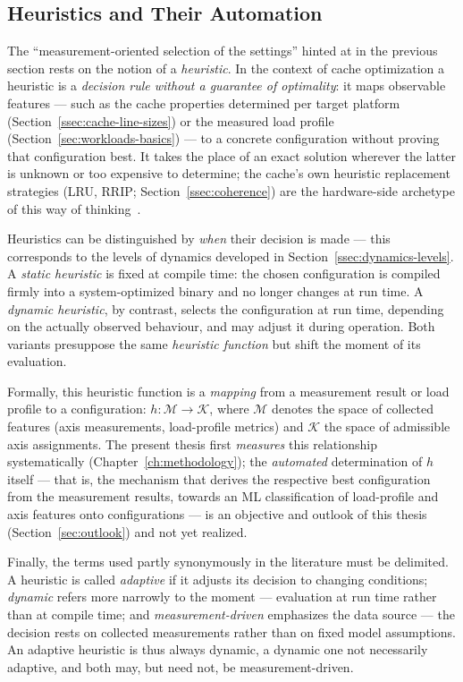 \subsection{Heuristics and Their Automation}\label{ssec:heuristics}
The ``measurement-oriented selection of the settings'' hinted at in the previous section rests on
the notion of a \emph{heuristic}. In the context of cache optimization a heuristic is a
\emph{decision rule without a guarantee of optimality}: it maps observable features --- such as the
cache properties determined per target platform (Section~\ref{ssec:cache-line-sizes}) or the
measured load profile (Section~\ref{sec:workloads-basics}) --- to a concrete configuration without
proving that configuration best. It takes the place of an exact solution wherever the latter is
unknown or too expensive to determine; the cache's own heuristic replacement strategies (LRU, RRIP\@;
Section~\ref{ssec:coherence}) are the hardware-side archetype of this way of
thinking~\cite{jaleel2010rrip}.

Heuristics can be distinguished by \emph{when} their decision is made --- this corresponds to the
levels of dynamics developed in Section~\ref{ssec:dynamics-levels}. A \emph{static heuristic} is
fixed at compile time: the chosen configuration is compiled firmly into a system-optimized binary
and no longer changes at run time. A \emph{dynamic heuristic}, by contrast, selects the
configuration at run time, depending on the actually observed behaviour, and may adjust it during
operation. Both variants presuppose the same \emph{heuristic function} but shift the moment of its
evaluation.

Formally, this heuristic function is a \emph{mapping} from a measurement result or load profile to a
configuration: $h: \mathcal{M} \rightarrow \mathcal{K}$, where $\mathcal{M}$ denotes the space of
collected features (axis measurements, load-profile metrics) and $\mathcal{K}$ the space of
admissible axis assignments. The present thesis first \emph{measures} this relationship
systematically (Chapter~\ref{ch:methodology}); the \emph{automated} determination of $h$ itself ---
that is, the mechanism that derives the respective best configuration from the measurement results,
towards an ML classification of load-profile and axis features onto configurations --- is an
objective and outlook of this thesis (Section~\ref{sec:outlook}) and not yet realized.

Finally, the terms used partly synonymously in the literature must be delimited. A heuristic is
called \emph{adaptive} if it adjusts its decision to changing conditions; \emph{dynamic} refers more
narrowly to the moment --- evaluation at run time rather than at compile time; and
\emph{measurement-driven} emphasizes the data source --- the decision rests on collected
measurements rather than on fixed model assumptions. An adaptive heuristic is thus always dynamic, a
dynamic one not necessarily adaptive, and both may, but need not, be measurement-driven.

